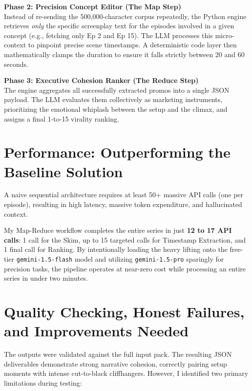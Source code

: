 \documentclass[10pt, a4paper]{article}
\begin{document}
\textbf{Phase 2: Precision Concept Editor (The Map Step)} \\
Instead of re-sending the 500,000-character corpus repeatedly, the Python engine retrieves \textit{only} the specific screenplay text for the episodes involved in a given concept (e.g., fetching only Ep 2 and Ep 15). The LLM processes this micro-context to pinpoint precise scene timestamps. A deterministic code layer then mathematically clamps the duration to ensure it falls strictly between 20 and 60 seconds.

\textbf{Phase 3: Executive Cohesion Ranker (The Reduce Step)} \\
The engine aggregates all successfully extracted promos into a single JSON payload. The LLM evaluates them collectively as marketing instruments, prioritizing the emotional whiplash between the setup and the climax, and assigns a final 1-to-15 virality ranking.

\section{Performance: Outperforming the Baseline Solution}
A naive sequential architecture requires at least 50+ massive API calls (one per episode), resulting in high latency, massive token expenditure, and hallucinated context. 

My Map-Reduce workflow completes the entire series in just \textbf{12 to 17 API calls}: 1 call for the Skim, up to 15 targeted calls for Timestamp Extraction, and 1 final call for Ranking. By intentionally loading the heavy lifting onto the free-tier \texttt{gemini-1.5-flash} model and utilizing \texttt{gemini-1.5-pro} sparingly for precision tasks, the pipeline operates at near-zero cost while processing an entire series in under two minutes.

\section{Quality Checking, Honest Failures, and Improvements Needed}
The outputs were validated against the full input pack. The resulting JSON deliverables demonstrate strong narrative cohesion, correctly pairing setup moments with intense cut-to-black cliffhangers. However, I identified two primary limitations during testing:
\end{document}
